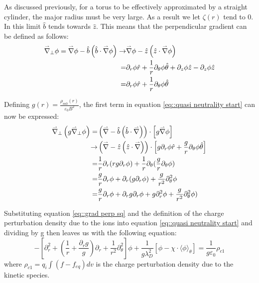 As discussed previously, for a torus to be effectively approximated by a straight cylinder, the major radius must be very large. As a result we let $\zeta(r)$ tend to 0. In this limit $\hat{b}$ tends towards $\hat{z}$. This means that the perpendicular gradient can be defined as follows:
\begin{align}
 \accentset{\rightharpoonup}{\nabla}_\perp\phi=\accentset{\rightharpoonup}{\nabla}\phi-\hat{b}\left(\hat{b}\cdot\accentset{\rightharpoonup}{\nabla}\phi\right) \rightarrow& \accentset{\rightharpoonup}{\nabla}\phi-\hat{z}\left(\hat{z}\cdot\accentset{\rightharpoonup}{\nabla}\phi\right)\nonumber\\
 =&\partial_r\phi\hat{r}+\frac{1}{r}\partial_\theta\phi\hat{\theta}+\partial_z\phi\hat{z}-\partial_z\phi\hat{z}\nonumber\\
 =& \partial_r\phi\hat{r}+\frac{1}{r}\partial_\theta\phi\hat{\theta}
\end{align}

Defining $g(r)=\frac{\rho_{m0}(r)}{\varepsilon_0B^2}$, the first term in equation \ref{eq::quasi neutrality start} can now be expressed:
\begin{align}
\accentset{\rightharpoonup}{\nabla}_\perp\left(g\accentset{\rightharpoonup}{\nabla}_\perp\phi\right)=&\left(\accentset{\rightharpoonup}{\nabla}-\hat{b}\left(\hat{b}\cdot\accentset{\rightharpoonup}{\nabla}\right)\right)\cdot\left[g \accentset{\rightharpoonup}{\nabla} \phi\right]\nonumber\\
\rightarrow& \left(\accentset{\rightharpoonup}{\nabla}-\hat{z}\left(\hat{z}\cdot\accentset{\rightharpoonup}{\nabla}\right)\right)\cdot\left[g \partial_r\phi\hat{r}+\frac{g}{r}\partial_\theta\phi\hat{\theta}\right]\nonumber\\
=&\frac{1}{r}\partial_r(rg\partial_r\phi)+\frac{1}{r}\partial_\theta(\frac{g}{r}\partial_\theta\phi)\nonumber\\
=&\frac{g}{r}\partial_r\phi+\partial_r(g\partial_r\phi)+\frac{g}{r^2}\partial_\theta^2\phi\nonumber\\
=&\frac{g}{r}\partial_r\phi+\partial_rg\partial_r\phi+g\partial_r^2\phi+\frac{g}{r^2}\partial_\theta^2\phi)\label{eq::grad perp sq}
\end{align}

Substituting equation \ref{eq::grad perp sq} and the definition of the charge perturbation density due to the ions into equation \ref{eq::quasi neutrality start} and dividing by g then leaves us with the following equation:
\begin{equation}\label{quasi neutrality}
 -\left[\partial_r^2+\left(\frac{1}{r}+\frac{\partial_rg}{g}\right)\partial_r+\frac{1}{r^2}\partial_\theta^2\right]\phi+\frac{1}{g\lambda_D^2}\left[\phi-\chi\cdot\langle\phi\rangle_\theta\right]=\frac{1}{g\varepsilon_0}\rho_{c1}
\end{equation}
where $\rho_{c1}=q_i\int (f-f_{eq})dv$ is the charge perturbation density due to the kinetic species.

